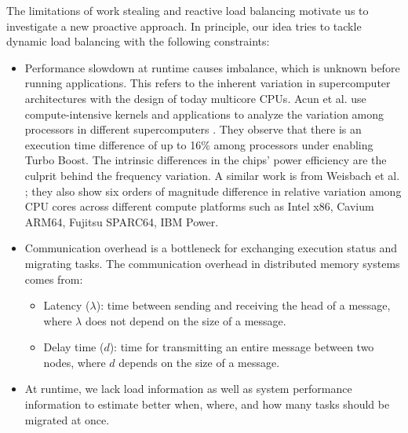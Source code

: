The limitations of work stealing and reactive load balancing motivate us to investigate a new proactive approach. In principle, our idea tries to tackle dynamic load balancing with the following constraints:
\begin{itemize}
	\item Performance slowdown at runtime causes imbalance, which is unknown before running applications. This refers to the inherent variation in supercomputer architectures with the design of today multicore CPUs. Acun et al. use compute-intensive kernels and applications to analyze the variation among processors in different supercomputers \cite{acun2016variturboboost}. They observe that there is an execution time difference of up to 16\% among processors under enabling Turbo Boost. The intrinsic differences in the chips’ power efficiency are the culprit behind the frequency variation. A similar work is from Weisbach et al. \cite{weisbach2018hwvariation}; they also show six orders of magnitude diﬀerence in relative variation among CPU cores across different compute platforms such as Intel x86, Cavium ARM64, Fujitsu SPARC64, IBM Power.
	\item Communication overhead is a bottleneck for exchanging execution status and migrating tasks. The communication overhead in distributed memory systems comes from:
		\begin{itemize}
			\item Latency ($\lambda$): time between sending and receiving the head of a message, where $\lambda$ does not depend on the size of a message.
			\item Delay time ($d$): time for transmitting an entire message between two nodes, where $d$ depends on the size of a message.
		\end{itemize}
	\item At runtime, we lack load information as well as system performance information to estimate better when, where, and how many tasks should be migrated at once.
\end{itemize}
